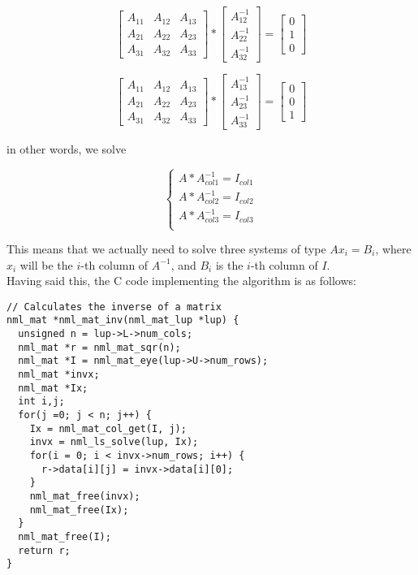 $$
\begin{bmatrix}
A_{11} & A_{12} & A_{13} \\
A_{21} & A_{22} & A_{23} \\
A_{31} & A_{32} & A_{33}
\end{bmatrix}
*
\begin{bmatrix}
A_{12}^{-1}  \\
A_{22}^{-1}  \\
A_{32}^{-1}
\end{bmatrix}
=
\begin{bmatrix}
0 \\
1 \\
0
\end{bmatrix}
$$

$$
\begin{bmatrix}
A_{11} & A_{12} & A_{13} \\
A_{21} & A_{22} & A_{23} \\
A_{31} & A_{32} & A_{33}
\end{bmatrix}
*
\begin{bmatrix}
A_{13}^{-1}  \\
A_{23}^{-1}  \\
A_{33}^{-1}
\end{bmatrix}
=
\begin{bmatrix}
0 \\
0 \\
1
\end{bmatrix}
$$

in other words, we solve

$$
\begin{cases}
A * A_{col1}^{-1} = I_{col1} \\
A * A_{col2}^{-1} = I_{col2} \\
A * A_{col3}^{-1} = I_{col3} \\
\end{cases}
$$

This means that we actually need to solve three systems of type $A x_i = B_i$, where $x_i$ will be the $i$-th column of $A^{-1}$, and $B_i$ is the $i$-th column of $I$.
\\

Having said this, the C code implementing the algorithm is as follows:

\begin{verbatim}
// Calculates the inverse of a matrix
nml_mat *nml_mat_inv(nml_mat_lup *lup) {
  unsigned n = lup->L->num_cols;
  nml_mat *r = nml_mat_sqr(n);
  nml_mat *I = nml_mat_eye(lup->U->num_rows);
  nml_mat *invx;
  nml_mat *Ix;
  int i,j;
  for(j =0; j < n; j++) {
    Ix = nml_mat_col_get(I, j);
    invx = nml_ls_solve(lup, Ix);
    for(i = 0; i < invx->num_rows; i++) {
      r->data[i][j] = invx->data[i][0];
    }
    nml_mat_free(invx);
    nml_mat_free(Ix);
  }
  nml_mat_free(I);
  return r;
} 
\end{verbatim}

